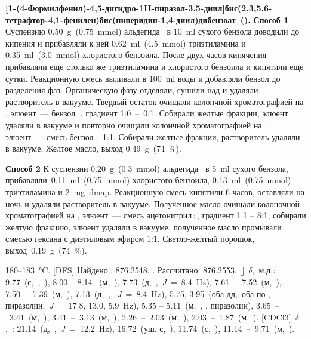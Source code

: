 \textbf{{[1-(4-Формилфенил)-4,5-дигидро-1H-пиразол-3,5-диил]бис(2,3,5,6-тетрафтор-4,1-фенилен)}бис(пиперидин-1,4-диил)дибензоат~().} \textbf{Способ 1} Суспензию \SI{0.50}{\gram}~(\SI{0.75}{\mmol}) альдегида~\textbf{} в \SI{10}{\milli\litre} сухого бензола доводили до кипения и прибавляли к ней \SI{0.62}{\milli\litre}~(\SI{4.5}{\mmol}) триэтиламина и \SI{0.35}{\milli\litre}~(\SI{3.0}{\mmol}) хлористого бензоила. После двух часов кипячения прибавляли еще столько же триэтиламина и хлористого бензоила и кипятили еще сутки. Реакционную смесь выливали в \SI{100}{\milli\litre} воды и добавляли бензол до разделения фаз. Органическую фазу отделяли, сушили над  и удаляли растворитель в вакууме. Твердый остаток очищали колончной хроматографией на , элюент~--- бензол\,:\,, градиент 1:0~--~0:1. Собирали желтые фракции, элюент удаляли в вакууме и повторно очищали колончной хроматографией на , элюент~--- смесь бензол\,:\,~1:1. Собирали желтые фракции, растворитель удаляли в вакууме. Желтое масло, выход \SI{0.49}{\gram}~(\SI{74}{\percent}).

\textbf{Способ 2} К суспензии \SI{0.20}{\gram}~(\SI{0.3}{\mmol}) альдегида~\textbf{} в \SI{5}{\milli\litre} сухого бензола, прибавляли~\SI{0.11}{\milli\litre}~(\SI{0.75}{\mmol}) хлористого бензоила, \SI{0.13}{\milli\litre}~(\SI{0.75}{\mmol}) триэтиламина и \SI{2}{\milli\gram}~\ac{dmap}. 
Реакционную смесь кипятили 6 часов, оставляли на ночь и удаляли растворитель в вакууме. 
Полученное масло очищали колоночной хроматографией на , элюент~--- смесь ацетонитрил\,:\,, градиент 1:1 -- 8:1, собирали желтую фракцию, элюент удаляли в вакууме, полученное масло промывали смесью гексана с диэтиловым эфиром 1:1. Светло-желтый порошок, выход~\SI{0.19}{\gram}~(\SI{74}{\percent}).
\begin{experimental}
     180--\SI{183}{\celsius}.
    [DFS] Найдено \ce{[M+]}: \num{876.2548}. . Рассчитано:  \num{876.2553}.
    []~$\delta$,~м.д.: 9.77~(с,~,~), 8.00 -- 8.14 ~(м,~), 7.73~(д,~,~\textit{J}~=~8.4~\si{\hertz}), 7.61~--~7.52~(м,~), 7.50~--~7.39~(м,~), 7.13~(д,~,,~\textit{J}~=~8.4~\si{\hertz}), 5.75, 3.95~(оба дд,~оба по , пиразолин,~\textit{J}~=~17.8, 13.0, 5.9~\si{\hertz}), 5.35 -- 5.11~(м,~, , пиразолин), 3.65~--~3.41~(м,~), 3.41~--~3.13~(м,~), 2.26~--~2.03~(м,~), 2.03~--~1.87~(м,~).
    [CDCl3]~$\delta$,~\si{\ppm}: 21.14~(д,~,~\textit{J}~=~12.2~\si{\hertz}), 16.72~(уш. с,~), 11.74~(с,~), 11.14~--~9.71~(м,~).
\end{experimental}

